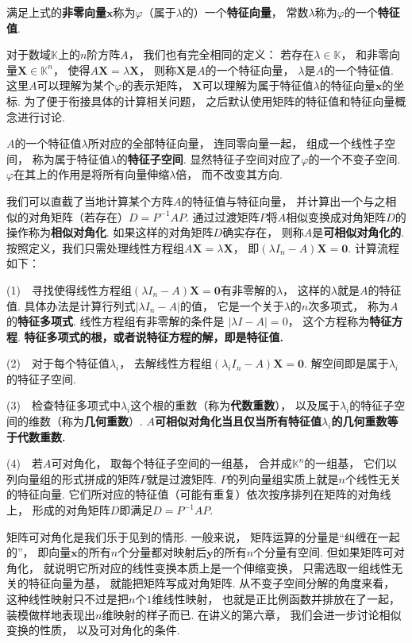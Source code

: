 满足上式的\textbf{非零向量}$\bm{x}$称为$\varphi$（属于$\lambda$的）一个\textbf{特征向量}，
常数$\lambda$称为$\varphi$的一个\textbf{特征值}.

对于数域$\mathbb{K}$上的$n$阶方阵$A$，
我们也有完全相同的定义：
若存在$\lambda \in \mathbb{K}$，
和非零向量$\bm{X} \in \mathbb{K}^n$，
使得$A \bm{X} = \lambda \bm{X}$，
则称$\bm{X}$是$A$的一个特征向量，
$\lambda$是$A$的一个特征值.
这里$A$可以理解为某个$\varphi$的表示矩阵，
$\bm{X}$可以理解为属于特征值$\lambda$的特征向量$\bm{x}$的坐标.
为了便于衔接具体的计算相关问题，
之后默认使用矩阵的特征值和特征向量概念进行讨论.

$A$的一个特征值$\lambda$所对应的全部特征向量，
连同零向量一起，
组成一个线性子空间，
称为属于特征值$\lambda$的\textbf{特征子空间}.
显然特征子空间对应了$\varphi$的一个不变子空间.
$\varphi$在其上的作用是将所有向量伸缩$\lambda$倍，
而不改变其方向.

我们可以直截了当地计算某个方阵$A$的特征值与特征向量，
并计算出一个与之相似的对角矩阵（若存在）$D = P^{-1}AP$.
通过过渡矩阵$P$将$A$相似变换成对角矩阵$D$的操作称为\textbf{相似对角化}.
如果这样的对角矩阵$D$确实存在，
则称$A$是\textbf{可相似对角化的}.
按照定义，我们只需处理线性方程组$A\bm{X} = \lambda \bm{X}$，
即$(\lambda I_n - A) \bm{X} = \bm{0}$.
计算流程如下：\medskip

(1)~~寻找使得线性方程组$(\lambda I_n - A)\bm{X} = \bm{0}$有非零解的$\lambda$，
这样的$\lambda$就是$A$的特征值.
具体办法是计算行列式$|\lambda I_n  - A|$的值，
它是一个关于$\lambda$的$n$次多项式，
称为$A$的\textbf{特征多项式}.
线性方程组有非零解的条件是
$|\lambda I - A| = 0$，
这个方程称为\textbf{特征方程}.
\textbf{特征多项式的根，或者说特征方程的解，即是特征值.}

(2)~~对于每个特征值$\lambda_i$，
去解线性方程组$(\lambda_i I_n - A)\bm{X} = \bm{0}$.
解空间即是属于$\lambda_i$的特征子空间.

(3)~~检查特征多项式中$\lambda_i$这个根的重数（称为\textbf{代数重数}），
以及属于$\lambda_i$的特征子空间的维数（称为\textbf{几何重数}）.
\textbf{$A$可相似对角化当且仅当所有特征值$\lambda_i$的几何重数等于代数重数.}

(4)~~若$A$可对角化，
取每个特征子空间的一组基，
合并成$\mathbb{K}^n$的一组基，
它们以列向量组的形式拼成的矩阵$P$就是过渡矩阵.
$P$的列向量组实质上就是$n$个线性无关的特征向量.
它们所对应的特征值（可能有重复）依次按序排列在矩阵的对角线上，
形成的对角矩阵$D$即满足$D = P^{-1}AP$.
\medskip


矩阵可对角化是我们乐于见到的情形.
一般来说，
矩阵运算的分量是“纠缠在一起的”，
即向量$\bm{x}$的所有$n$个分量都对映射后$\bm{y}$的所有$n$个分量有空间.
但如果矩阵可对角化，
就说明它所对应的线性变换本质上是一个伸缩变换，
只需选取一组线性无关的特征向量为基，
就能把矩阵写成对角矩阵.
从不变子空间分解的角度来看，
这种线性映射只不过是把$n$个$1$维线性映射，
也就是正比例函数并排放在了一起，
装模做样地表现出$n$维映射的样子而已.
在讲义的第六章，
我们会进一步讨论相似变换的性质，
以及可对角化的条件.





